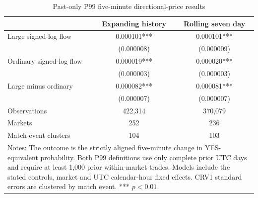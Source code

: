 \begin{table}[htbp]
\centering
\caption{Past-only P99 five-minute directional-price results}
\label{tab:v5-primary}
\small
\begin{tabular}{lcc}
\toprule
 & Expanding history & Rolling seven day \\
\midrule
Large signed-log flow & 0.000101*** & 0.000101*** \\
 & (0.000008) & (0.000009) \\
Ordinary signed-log flow & 0.000019*** & 0.000020*** \\
 & (0.000003) & (0.000003) \\
Large minus ordinary & 0.000082*** & 0.000081*** \\
 & (0.000007) & (0.000007) \\
Observations & 422,314 & 370,079 \\
Markets & 252 & 236 \\
Match-event clusters & 104 & 103 \\
\bottomrule
\multicolumn{3}{p{0.92\textwidth}}{\footnotesize Notes: The outcome is the strictly aligned five-minute change in YES-equivalent probability. Both P99 definitions use only complete prior UTC days and require at least 1,000 prior within-market trades. Models include the stated controls, market and UTC calendar-hour fixed effects. CRV1 standard errors are clustered by match event. *** $p<0.01$.}
\end{tabular}
\end{table}
